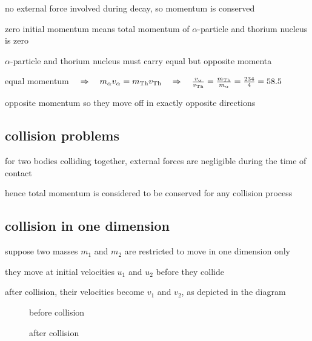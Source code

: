 \begin{soln}
    
 no external force involved during decay, so momentum is conserved

zero initial momentum means total momentum of $\alpha$-particle and thorium nucleus is zero

$\alpha$-particle and thorium nucleus must carry equal but opposite momenta

equal momentum $\quad \Rightarrow \quad m_\alpha v_\alpha = m_\text{Th} v_\text{Th} \quad \Rightarrow \quad \frac{v_\alpha}{v_\text{Th}} = \frac{m_\text{Th}}{m_\alpha} = \frac{234}{4}=58.5 $

opposite momentum so they move off in exactly opposite directions \end{soln}



\subsection{collision problems}


for two bodies colliding together, external forces are negligible during the time of contact

hence total momentum is considered to be conserved for any collision process

\subsection{collision in one dimension}

suppose two masses $m_1$ and $m_2$ are restricted to move in one dimension only

they move at initial velocities $u_1$ and $u_2$ before they collide

after collision, their velocities become $v_1$ and $v_2$, as depicted in the diagram

\begin{figure}[!ht]
\centering
\begin{minipage}{0.45\textwidth}
	\begin{center}
		
		before collision
	\end{center}
\end{minipage}\hfil
\begin{minipage}{0.45\textwidth}
	\begin{center}
		
		after collision
	\end{center}
\end{minipage}
\end{figure}

